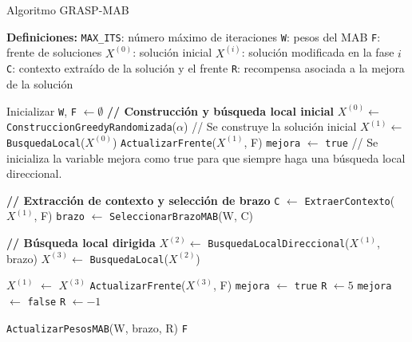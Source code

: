 \documentclass[12pt,a4paper]{book}
\begin{document}
\begin{algorithm}[H]
\caption{Algoritmo GRASP-MAB}
\begin{algorithmic}[1]
    \Statex \textbf{Definiciones:}
    \Statex \hspace{1em} \texttt{MAX\_ITS}: número máximo de iteraciones
    \Statex \hspace{1em} \texttt{W}: pesos del MAB
    \Statex \hspace{1em} \texttt{F}: frente de soluciones
    \Statex \hspace{1em} $X^{(0)}$: solución inicial
    \Statex \hspace{1em} $X^{(i)}$: solución modificada en la fase $i$
    \Statex \hspace{1em} \texttt{C}: contexto extraído de la solución y el frente
    \Statex \hspace{1em} \texttt{R}: recompensa asociada a la mejora de la solución

    \Statex

    \State Inicializar \texttt{W}, \texttt{F} $\gets \emptyset$
        \Statex \textbf{// Construcción y búsqueda local inicial}
        \State $X^{(0)}\gets$ \texttt{ConstruccionGreedyRandomizada}($\alpha$) // Se construye la solución inicial
        \State $X^{(1)}\gets$ \texttt{BusquedaLocal}($X^{(0)}$)
        \State \texttt{ActualizarFrente}($X^{(1)}$, F)
        \State \texttt{mejora} $\gets$ \texttt{true} // Se inicializa la variable mejora como true para que siempre haga una búsqueda local direccional.
        
            \Statex \textbf{// Extracción de contexto y selección de brazo}
            \State \texttt{C} $\gets$ \texttt{ExtraerContexto}($X^{(1)}$, F)
            \State \texttt{brazo} $\gets$ \texttt{SeleccionarBrazoMAB}(W, C)
            
            \Statex \textbf{// Búsqueda local dirigida}
            \State $X^{(2)}\gets$ \texttt{BusquedaLocalDireccional}($X^{(1)}$, brazo)
            \State $X^{(3)}\gets$ \texttt{BusquedaLocal}($X^{(2)}$)
            
                \State \texttt{$X^{(1)}$} $\gets$ $X^{(3)}$
                \State \texttt{ActualizarFrente}($X^{(3)}$, F)
                \State \texttt{mejora} $\gets$ \texttt{true}
                \State \texttt{R} $\gets 5$
            \Else
                \State \texttt{mejora} $\gets$ \texttt{false}
                \State \texttt{R} $\gets -1$
            \EndIf

            \State \texttt{ActualizarPesosMAB}(W, brazo, R)
        \EndWhile
    \EndFor
    \State \Return \texttt{F}
\end{algorithmic}
\end{algorithm}
\end{document}
